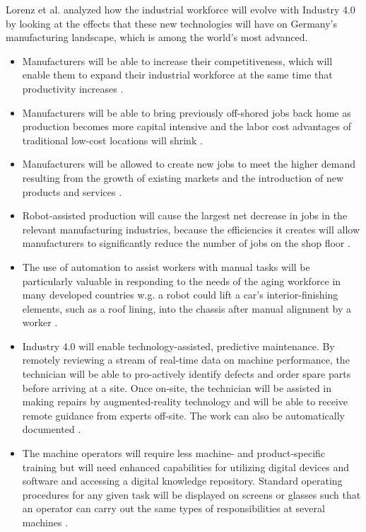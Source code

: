 Lorenz et al. \cite{MANMACHINE} analyzed how the industrial workforce will evolve with Industry 4.0 by looking at the effects that these new technologies will have on Germany’s manufacturing landscape, which is among the world’s most advanced. 
\begin{itemize}
	\item Manufacturers will be able to increase their competitiveness, which will enable them to expand their industrial workforce at the same time that productivity increases \cite{MANMACHINE,IN4BCG}.
	\item Manufacturers will be able to bring previously off-shored jobs back home as production becomes more capital intensive and the labor cost advantages of traditional low-cost locations will shrink \cite{MANMACHINE}.
	\item Manufacturers will be allowed to create new jobs to meet the higher demand resulting from the growth of existing markets and the introduction of new products and services \cite{IN4BCG,INDUSINTERNET,MANMACHINE}.
	\item Robot-assisted production will cause the largest net decrease in jobs in the relevant manufacturing industries, because the efficiencies it creates will allow manufacturers to significantly reduce the number of jobs on the shop floor \cite{MANMACHINE}.
	\item The use of automation to assist workers with manual tasks will be particularly valuable in responding to the needs of the aging workforce in many developed countries w.g. a robot could lift a car’s interior-finishing elements, such as a roof lining, into the chassis after manual alignment by a worker \cite{MANMACHINE}.
	\item Industry 4.0 will enable technology-assisted, predictive maintenance. By remotely reviewing a stream of real-time data on machine performance, the technician will be able to pro-actively identify defects and order spare parts before arriving at a site. Once on-site, the technician will be assisted in making repairs by augmented-reality technology and will be able to receive remote guidance from experts off-site. The work can also be automatically documented \cite{MANMACHINE}.
	\item The machine operators will require less machine- and product-specific training but will need enhanced capabilities for utilizing digital devices and software and accessing a digital knowledge repository. Standard operating procedures for any given task will be displayed on screens or glasses such that an operator can carry out the same types of responsibilities at several machines \cite{MANMACHINE}.
\end{itemize}
